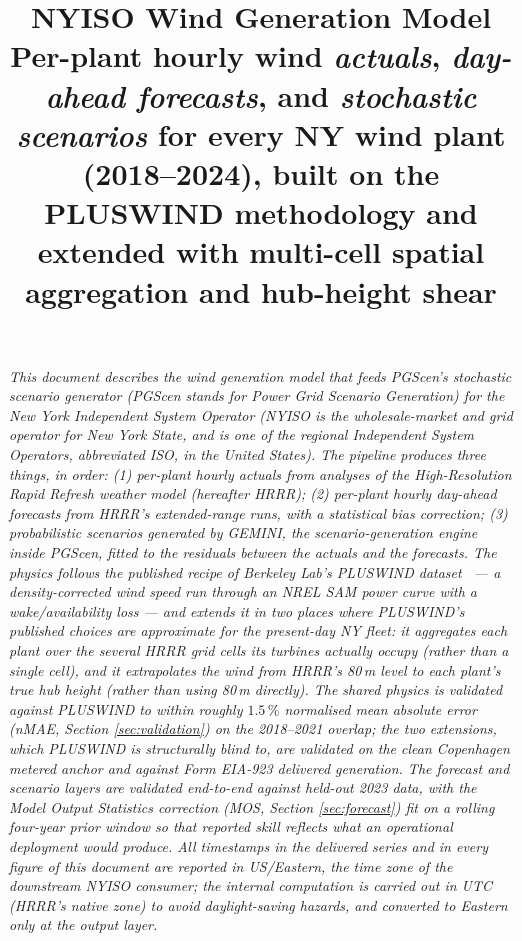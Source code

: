 \documentclass[11pt]{article}
\title{NYISO Wind Generation Model\\
       \large Per-plant hourly wind \emph{actuals}, \emph{day-ahead forecasts},
       and \emph{stochastic scenarios} for every NY wind plant
       (2018--2024), built on the PLUSWIND methodology and extended with
       multi-cell spatial aggregation and hub-height shear}
\author{}
\date{}
\begin{document}
\maketitle

\noindent
\textit{This document describes the wind generation model that feeds
PGScen's stochastic scenario generator (PGScen stands for Power Grid
Scenario Generation) for the New York Independent System Operator
(NYISO is the wholesale-market and grid operator for New York State,
and is one of the regional Independent System Operators, abbreviated
ISO, in the United States). The pipeline produces three things, in
order:
(1) per-plant hourly \emph{actuals} from analyses of the
High-Resolution Rapid Refresh weather model (hereafter HRRR); (2)
per-plant hourly \emph{day-ahead forecasts} from HRRR's extended-range
runs, with a statistical bias correction; (3) probabilistic
\emph{scenarios} generated by GEMINI, the scenario-generation engine
inside PGScen, fitted to the residuals between the actuals and the
forecasts. The physics follows the published recipe of Berkeley Lab's
PLUSWIND dataset~\citep{millstein2023pluswind} --- a density-corrected
wind speed run through an NREL SAM power curve with a wake/availability
loss --- and \emph{extends} it in two places where PLUSWIND's published
choices are approximate for the present-day NY fleet: it aggregates each
plant over the several HRRR grid cells its turbines actually occupy
(rather than a single cell), and it extrapolates the wind from HRRR's
80\,m level to each plant's true hub height (rather than using 80\,m
directly). The shared physics is validated against PLUSWIND to within
roughly $1.5\,\%$ normalised mean absolute error (nMAE, Section
\ref{sec:validation}) on the 2018--2021 overlap; the two extensions,
which PLUSWIND is structurally blind to, are validated on the clean
Copenhagen metered anchor and against Form EIA-923 delivered generation.
The forecast and scenario layers are validated end-to-end against
held-out 2023 data, with the Model Output Statistics correction (MOS,
Section \ref{sec:forecast}) fit on a rolling four-year prior window so
that reported skill reflects what an operational deployment would
produce. All timestamps in the delivered series and in every figure of
this document are reported in US/Eastern, the time zone of the
downstream NYISO consumer; the internal computation is carried out in
UTC (HRRR's native zone) to avoid daylight-saving hazards, and converted
to Eastern only at the output layer.}

\end{document}
